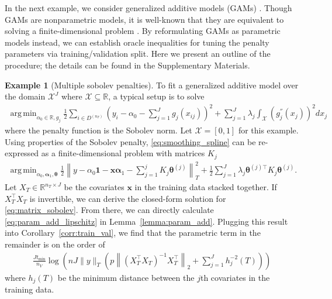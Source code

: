 \documentclass[12pt]{article} %
\theoremstyle{definition}
\newtheorem{example}{Example}
\DeclareMathOperator*{\argmin}{arg\,min}
\begin{document}
In the next example, we consider generalized additive models (GAMs) \citep{hastie1990generalized}.
Though GAMs are nonparametric models, it is well-known that they are equivalent to solving a finite-dimensional problem \citep{green1993nonparametric, o1986automatic, buja1989linear}.
By reformulating GAMs as parametric models instead, we can establish oracle inequalities for tuning the penalty parameters via training/validation split.
Here we present an outline of the procedure; the details can be found in the Supplementary Materials.
\begin{example}[Multiple sobolev penalties]
	\label{example:sobolev}
	To fit a generalized additive model over the domain $\mathcal{X}^J$ where $\mathcal{X} \subseteq \mathbb{R}$, a typical setup is to solve
	\begin{align}
	\argmin_{\alpha_0 \in \mathbb{R}, g_j}
	\frac{1}{2} \sum_{i\in D^{(n_T)}}
	\left(
	y_i - \alpha_0 - \sum_{j=1}^J g_j(x_{ij})
	\right)^2
	+ \sum_{j=1}^{J} \lambda_j \int_{\mathcal{X}} \left(g_j^{''}(x_j)\right)^{2} dx_j
	\label{eq:smoothing_spline}
	\end{align}
	where the penalty function is the Sobolev norm.
	Let $\mathcal{X} = [0,1]$ for this example.
	Using properties of the Sobolev penalty, \eqref{eq:smoothing_spline} can be re-expressed as a finite-dimensional problem with matrices $K_j$
	\begin{align}
	\argmin_{\alpha_0, \boldsymbol{\alpha}_1, \boldsymbol{\theta}}
	\frac{1}{2}
	\left \|
	y -
	\alpha_0 \boldsymbol{1}
	- \boldsymbol{x} \boldsymbol{\alpha}_1
	- \sum_{j=1}^j K_j \boldsymbol{\theta}^{(j)}
	\right \|^2_T
	+
	\frac{1}{2}
	\sum_{j = 1}^J
	\lambda_j \boldsymbol{\theta}^{(j)\top} K_j \boldsymbol{\theta}^{(j)}.
	\label{eq:matrix_sobolev}
	\end{align}
	Let $X_T \in \mathbb{R}^{n_T\times J}$ be the covariates $\boldsymbol{x}$ in the training data stacked together.
	If $X_T^\top X_T$ is invertible, we can derive the closed-form solution for \eqref{eq:matrix_sobolev}.
	From there, we can directly calculate \eqref{eq:param_add_lipschitz} in Lemma~\ref{lemma:param_add}.
	Plugging this result into Corollary~\ref{corr:train_val}, we find that the parametric term in the remainder is on the order of
	\begin{align}
	\frac{J t_{\min}}{n_{V}} \log \left (
	n
	J
	\|y\|_T
	\left(
	p
	\left \|
	\left(
	X_T^\top X_T
	\right)^{-1}
	X_T^\top
	\right \|_2
	+
	\sum_{j=1}^J h_j^{-2}(T)
	\right)
	\right )
	\label{eq:sobolev_param}
	\end{align}
	where $h_j(T)$ be the minimum distance between the $j$th covariates in the training data.
\end{example}
\end{document}
